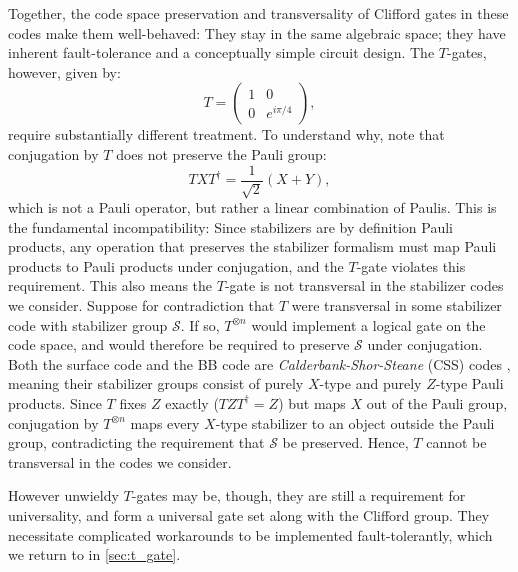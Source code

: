 Together, the code space preservation and transversality of Clifford gates in these codes make them well-behaved: They stay in the same algebraic space; they have inherent fault-tolerance and a conceptually simple circuit design. %
The $T$-gates, however, given by:
\[
T = \begin{pmatrix}
1 & 0 \\
0 & e^{i\pi/4}
\end{pmatrix},
\]
require substantially different treatment. To understand why, note that conjugation by $T$ does not preserve the Pauli group:
\[
TXT^\dagger = \frac{1}{\sqrt{2}}(X + Y),
\]
which is not a Pauli operator, but rather a linear combination of Paulis. This is the fundamental incompatibility: Since stabilizers are by definition Pauli products, any operation that preserves the stabilizer formalism must map Pauli products to Pauli products under conjugation, and the $T$-gate violates this requirement. This also means the $T$-gate is not transversal in the stabilizer codes we consider. Suppose for contradiction that $T$ were transversal in some stabilizer code with stabilizer group $\mathcal{S}$. If so, $T^{\otimes n}$ would implement a logical gate on the code space, and would therefore be required to preserve $\mathcal{S}$ under conjugation. Both the surface code and the BB code are \emph{Calderbank-Shor-Steane} (CSS) codes \cite{Nielsen_Chuang_2010}, meaning their stabilizer groups consist of purely $X$-type and purely $Z$-type Pauli products. Since $T$ fixes $Z$ exactly ($TZT^\dagger = Z$) but maps $X$ out of the Pauli group, conjugation by $T^{\otimes n}$ maps every $X$-type stabilizer to an object outside the Pauli group, contradicting the requirement that $\mathcal{S}$ be preserved. Hence, $T$ cannot be transversal in the codes we consider.

However unwieldy $T$-gates may be, though, they are still a requirement for universality, and form a universal gate set along with the Clifford group. They necessitate complicated workarounds to be implemented fault-tolerantly, 
which we return to in \cref{sec:t_gate}.


